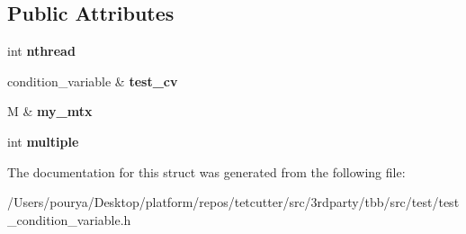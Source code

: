 \subsection*{Public Attributes}
\begin{DoxyCompactItemize}
\item 
\hypertarget{structWorkForCondVarWaitPredAndNotifyAll_af99ce86999ec66a3b2a86ef0e3d4944e}{}int {\bfseries nthread}\label{structWorkForCondVarWaitPredAndNotifyAll_af99ce86999ec66a3b2a86ef0e3d4944e}

\item 
\hypertarget{structWorkForCondVarWaitPredAndNotifyAll_a6772ba4ea4b9e4f87bf6a170566e2c6c}{}condition\+\_\+variable \& {\bfseries test\+\_\+cv}\label{structWorkForCondVarWaitPredAndNotifyAll_a6772ba4ea4b9e4f87bf6a170566e2c6c}

\item 
\hypertarget{structWorkForCondVarWaitPredAndNotifyAll_a068bb31642c5ec0772635425e931cca5}{}M \& {\bfseries my\+\_\+mtx}\label{structWorkForCondVarWaitPredAndNotifyAll_a068bb31642c5ec0772635425e931cca5}

\item 
\hypertarget{structWorkForCondVarWaitPredAndNotifyAll_a819625ebb52c1c124f94b3a86c8c3765}{}int {\bfseries multiple}\label{structWorkForCondVarWaitPredAndNotifyAll_a819625ebb52c1c124f94b3a86c8c3765}

\end{DoxyCompactItemize}


The documentation for this struct was generated from the following file\+:\begin{DoxyCompactItemize}
\item 
/\+Users/pourya/\+Desktop/platform/repos/tetcutter/src/3rdparty/tbb/src/test/test\+\_\+condition\+\_\+variable.\+h\end{DoxyCompactItemize}
